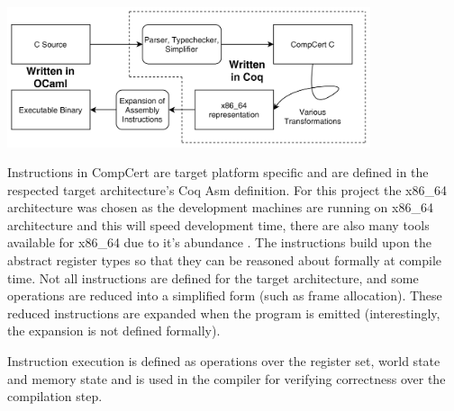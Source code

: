     
    
    \begin{center}
        \includegraphics[width=0.8\textwidth]{ccomp-graph.png}
    \end{center}
    
    Instructions in CompCert are target platform specific and are defined in the respected target architecture's Coq Asm definition. For this project the x86\_64 architecture was chosen as the development machines are running on x86\_64 architecture and this will speed development time, there are also many tools available for x86\_64 due to it's abundance
    . The instructions build upon the abstract register types so that they can be reasoned about formally at compile time. Not all instructions are defined for the target architecture, and some operations are reduced into a simplified form (such as frame allocation). These reduced instructions are expanded when the program is emitted (interestingly, the expansion is not defined formally).
    
    Instruction execution is defined as operations over the register set, world state and memory state and is used in the compiler for verifying correctness over the compilation step.
    
    
